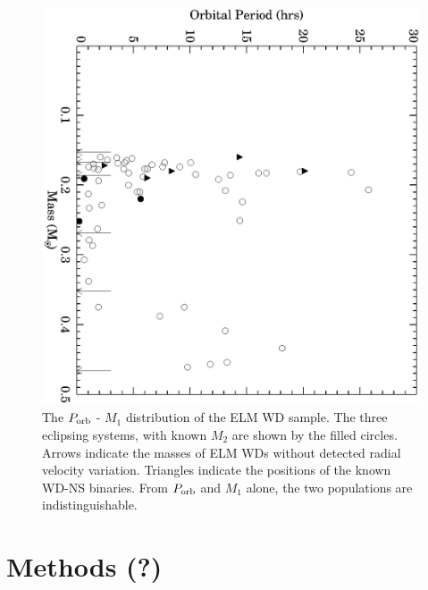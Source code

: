 \documentclass[letterpaper,12pt,preprint]{aastex}
\begin{document}
\begin{figure}[h!]
\begin{center}
\includegraphics[width=0.7\columnwidth]{Porb_M1.eps}
\caption{The $P_{\rm orb}$ - $M_1$ distribution of the ELM WD sample. The three eclipsing systems, with known $M_2$ are shown by the filled circles. Arrows indicate the masses of ELM WDs without detected radial velocity variation. Triangles indicate the positions of the known WD-NS binaries. From $P_{\rm orb}$ and $M_1$ alone, the two populations are indistinguishable.}
\end{center}
\end{figure}

\section{Methods (?)}
\end{document}

